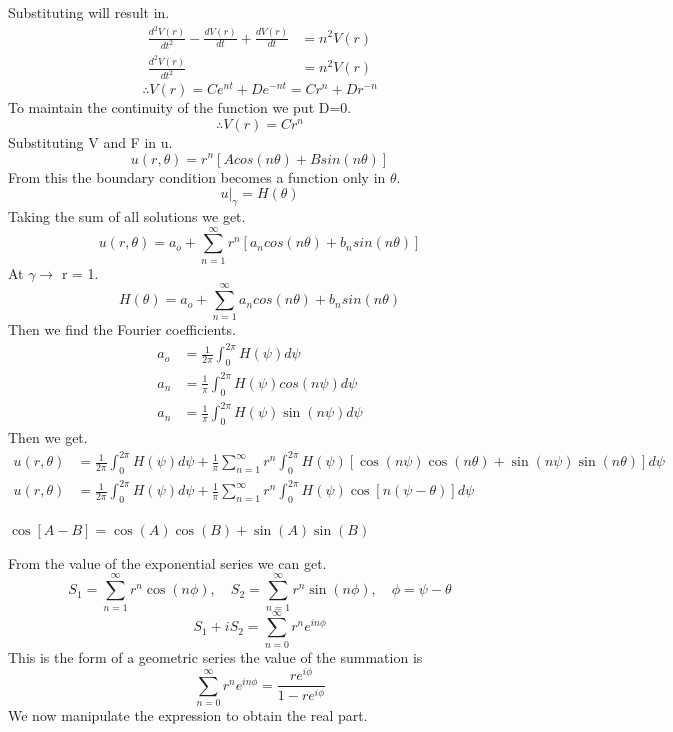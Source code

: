 Substituting will result in.
\begin{align*}
\frac{d^2V(r)}{dt^2}-\frac{dV(r)}{dt}+\frac{dV(r)}{dt}&=n^2V(r)
\\
\frac{d^2V(r)}{dt^2} &= n^2V(r)
\end{align*}
\[
\therefore V(r) = Ce^{nt}+De^{-nt} = Cr^n+Dr^{-n}    
\]
To maintain the continuity of the function we put D=0.
\[
\therefore V(r) = Cr^n
\]
Substituting V and F in u.
\begin{equation}
u(r,\theta) = r^n[A cos(n\theta)+B sin(n\theta)]
\end{equation}
From this the boundary condition becomes a function only in $\theta$.
\begin{equation}
u|_\gamma = H(\theta)
\end{equation}
Taking the sum of all solutions we get.
\[
    u(r,\theta) = a_o + \sum_{n=1}^{\infty} r^n[a_n cos(n\theta)+b_n sin(n\theta)]    
\]
At $\gamma \longrightarrow $ r = 1.
\[
    H(\theta) = a_o + \sum_{n=1}^{\infty} a_n cos(n\theta)+b_n sin(n\theta) 
\]
Then we find the Fourier coefficients.
\begin{align*}
a_o &= \frac{1}{2\pi}\int_{0}^{2\pi} H(\psi ) d\psi 
\\
a_n &=\frac{1}{\pi}\int_{0}^{2\pi} H(\psi ) cos(n\psi ) d\psi 
\\
a_n &=\frac{1}{\pi}\int_{0}^{2\pi} H(\psi ) \sin(n\psi ) d\psi 
\end{align*}
Then we get.
\begin{align*}
u(r,\theta) &= \frac{1}{2\pi}\int_{0}^{2\pi} H(\psi ) d\psi  + \frac{1}{\pi}\sum_{n=1}^{\infty} r^n \int_{0}^{2\pi} H(\psi )[\cos(n\psi )\cos(n\theta) + \sin(n\psi )\sin(n\theta)]d\psi 
\\
u(r,\theta) &= \frac{1}{2\pi}\int_{0}^{2\pi} H(\psi ) d\psi  + \frac{1}{\pi}\sum_{n=1}^{\infty}r^n\int_{0}^{2\pi} H(\psi )\cos[n(\psi  - \theta)]d\psi 
\end{align*}
\begin{enrichment*}{}
    $\cos[A-B] = \cos(A)\cos(B) + \sin(A)\sin(B)$
\end{enrichment*}
From the value of the exponential series we can get.
\[
    S_1 = \sum_{n=1}^{\infty} r^n \cos(n\phi),\quad S_2 =\sum_{n=1}^{\infty}r^n \sin(n\phi), \quad \phi = \psi  - \theta    
\]
\[
    S_1 + i S_2 = \sum_{n=0}^{\infty} r^n e^{in\phi}    
\]
This is the form of a geometric series the value of the summation is
\[
    \sum_{n=0}^{\infty} r^n e^{in\phi} = \frac{r e^{i\phi}}{1- r e^{i\phi}}
\]
We now manipulate the expression to obtain the real part.
